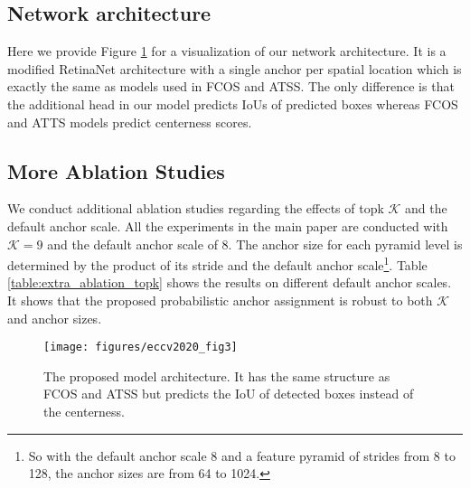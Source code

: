\documentclass[runningheads]{llncs}
\begin{document}
\subsection{Network architecture}
Here we provide Figure \ref{fig3} for a visualization of our network architecture. It is a modified RetinaNet architecture with a single anchor per spatial location which is exactly the same as models used in FCOS\cite{fcos} and ATSS\cite{atss}. The only difference is that the additional head in our model predicts IoUs of predicted boxes whereas FCOS and ATTS models predict centerness scores.

\subsection{More Ablation Studies}
We conduct additional ablation studies regarding the effects of topk $\mathcal{K}$ and the default anchor scale. All the experiments in the main paper are conducted with $\mathcal{K}=9$ and the default anchor scale of 8. The anchor size for each pyramid level is determined by the product of its stride and the default anchor scale\footnote{So with the default anchor scale 8 and a feature pyramid of strides from 8 to 128, the anchor sizes are from 64 to 1024.}. Table \ref{table:extra_ablation_topk} shows the results on different default anchor scales. It shows that the proposed probabilistic anchor assignment is robust to both $\mathcal{K}$ and anchor sizes. 
\begin{figure}[t]
	\begin{center}
		\texttt{[image: figures/eccv2020\_fig3]}
	\end{center}
	\caption{The proposed model architecture. It has the same structure as FCOS\cite{fcos} and ATSS\cite{atss} but predicts the IoU of detected boxes instead of the centerness.}
	\label{fig3}
\end{figure}
\end{document}
